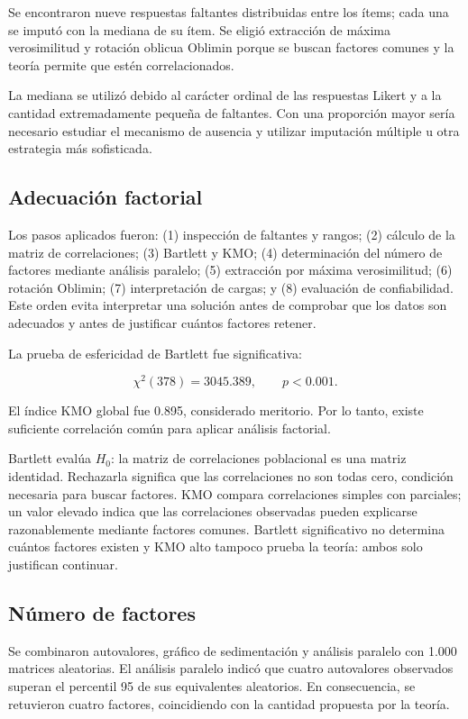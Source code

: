 \documentclass[11pt,letterpaper]{article}
\begin{document}
Se encontraron nueve respuestas faltantes distribuidas entre los ítems; cada una se imputó con la mediana de su ítem. Se eligió extracción de máxima verosimilitud y rotación oblicua Oblimin porque se buscan factores comunes y la teoría permite que estén correlacionados.

La mediana se utilizó debido al carácter ordinal de las respuestas Likert y a la cantidad extremadamente pequeña de faltantes. Con una proporción mayor sería necesario estudiar el mecanismo de ausencia y utilizar imputación múltiple u otra estrategia más sofisticada.

\subsection{Adecuación factorial}

Los pasos aplicados fueron: (1) inspección de faltantes y rangos; (2) cálculo de la matriz de correlaciones; (3) Bartlett y KMO; (4) determinación del número de factores mediante análisis paralelo; (5) extracción por máxima verosimilitud; (6) rotación Oblimin; (7) interpretación de cargas; y (8) evaluación de confiabilidad. Este orden evita interpretar una solución antes de comprobar que los datos son adecuados y antes de justificar cuántos factores retener.

La prueba de esfericidad de Bartlett fue significativa:

\[
\chi^2(378)=3045.389,\qquad p<0.001.
\]

El índice KMO global fue 0.895, considerado meritorio. Por lo tanto, existe suficiente correlación común para aplicar análisis factorial.

Bartlett evalúa $H_0$: la matriz de correlaciones poblacional es una matriz identidad. Rechazarla significa que las correlaciones no son todas cero, condición necesaria para buscar factores. KMO compara correlaciones simples con parciales; un valor elevado indica que las correlaciones observadas pueden explicarse razonablemente mediante factores comunes. Bartlett significativo no determina cuántos factores existen y KMO alto tampoco prueba la teoría: ambos solo justifican continuar.

\subsection{Número de factores}

Se combinaron autovalores, gráfico de sedimentación y análisis paralelo con 1.000 matrices aleatorias. El análisis paralelo indicó que cuatro autovalores observados superan el percentil 95 de sus equivalentes aleatorios. En consecuencia, se retuvieron cuatro factores, coincidiendo con la cantidad propuesta por la teoría.
\end{document}
